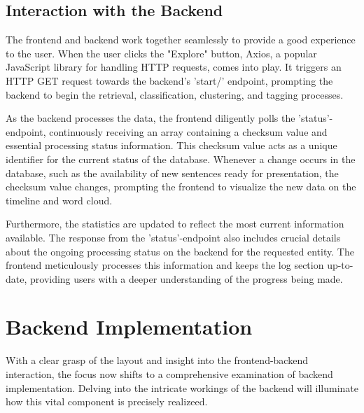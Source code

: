 \documentclass[a4paper,10pt]{report} %
\begin{document}
\subsection{Interaction with the Backend}
The frontend and backend work together seamlessly to provide a good experience to the user. When the user clicks the "Explore" button, Axios, a popular JavaScript library for handling HTTP requests, comes into play. It triggers an HTTP GET request towards the backend's 'start/' endpoint, prompting the backend to begin the retrieval, classification, clustering, and tagging processes.

As the backend processes the data, the frontend diligently polls the 'status'-endpoint, continuously receiving an array containing a checksum value and essential processing status information. This checksum value acts as a unique identifier for the current status of the database. Whenever a change occurs in the database, such as the availability of new sentences ready for presentation, the checksum value changes, prompting the frontend to visualize the new data on the timeline and word cloud.

Furthermore, the statistics are updated to reflect the most current information available. The response from the 'status'-endpoint also includes crucial details about the ongoing processing status on the backend for the requested entity. The frontend meticulously processes this information and keeps the log section up-to-date, providing users with a deeper understanding of the progress being made.



\section{Backend Implementation}
With a clear grasp of the layout and insight into the frontend-backend interaction, the focus now shifts to a comprehensive examination of backend implementation. Delving into the intricate workings of the backend will illuminate how this vital component is precisely realizeed.
\end{document}
